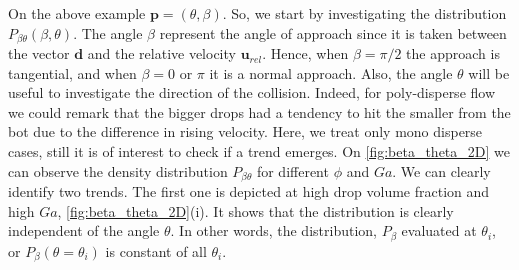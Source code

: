 On the above example $\bm{p} = (\theta,\beta)$. 
So, we start by investigating the distribution $P_{\beta\theta}(\beta,\theta)$. 
The angle $\beta$ represent the angle of approach since it is taken between the vector $\bm{d}$ and the relative velocity $\bm{u}_{rel}$. 
Hence, when $\beta = \pi/2$ the approach is tangential, and when $\beta= 0$ or $\pi$ it is a normal approach.  
Also, the angle $\theta$ will be useful to investigate the direction of the collision. 
Indeed, for poly-disperse flow we could remark that the bigger drops had a tendency to hit the smaller from the bot due to the difference in rising velocity.
Here, we treat only mono disperse cases, still it is of interest to check if a trend emerges. 
On \ref{fig:beta_theta_2D} we can observe the density distribution $P_{\beta\theta}$ for different $\phi$ and $Ga$. 
We can clearly identify two trends. 
The first one is depicted at high drop volume fraction and  high $Ga$, \ref{fig:beta_theta_2D}(i).
It shows that the distribution is clearly independent of the angle $\theta$.
In other words, the distribution, $P_{\beta}$ evaluated at $\theta_i$, or $P_{\beta}(\theta=\theta_i)$ is constant of all $\theta_i$. 
